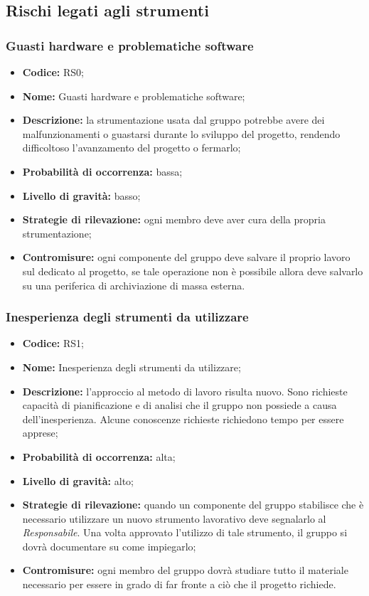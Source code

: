 \documentclass[../PianodiProgetto.tex]{subfiles}
\begin{document}
	\subsection{Rischi legati agli strumenti}
	
	\subsubsection{Guasti hardware e problematiche software}
	\begin{itemize}
		\item \textbf{Codice:} RS0;
		\item \textbf{Nome:} Guasti hardware e problematiche software;
		\item \textbf{Descrizione:} la strumentazione usata dal gruppo potrebbe avere dei malfunzionamenti o guastarsi durante lo sviluppo del progetto, rendendo difficoltoso l'avanzamento del progetto o fermarlo;
		\item \textbf{Probabilità di occorrenza:} bassa;
		\item \textbf{Livello di gravità:} basso;
		\item \textbf{Strategie di rilevazione:} ogni membro deve aver cura della propria strumentazione;
		\item \textbf{Contromisure:} ogni componente del gruppo deve salvare il proprio lavoro sul   dedicato al progetto, se tale operazione non è possibile allora deve salvarlo su una periferica di archiviazione di massa esterna.
	\end{itemize}
	
	\subsubsection{Inesperienza degli strumenti da utilizzare}
	\begin{itemize}
		\item \textbf{Codice:} RS1;
		\item \textbf{Nome:} Inesperienza degli strumenti da utilizzare;
		\item \textbf{Descrizione:} l'approccio al metodo di lavoro risulta nuovo. Sono richieste capacità di pianificazione e di analisi che il gruppo non possiede a causa dell'inesperienza. Alcune conoscenze richieste richiedono tempo per essere apprese;
		\item \textbf{Probabilità di occorrenza:} alta;
		\item \textbf{Livello di gravità:} alto;
		\item \textbf{Strategie di rilevazione:} quando un componente del gruppo stabilisce che è necessario utilizzare un nuovo strumento lavorativo deve segnalarlo al  \textit{Responsabile}. Una volta approvato l'utilizzo di tale strumento, il gruppo si dovrà documentare su come impiegarlo;
		\item \textbf{Contromisure:} ogni membro del gruppo dovrà studiare tutto il materiale necessario per essere in grado di far fronte  a ciò che il progetto richiede.
	\end{itemize}
	
\end{document}
